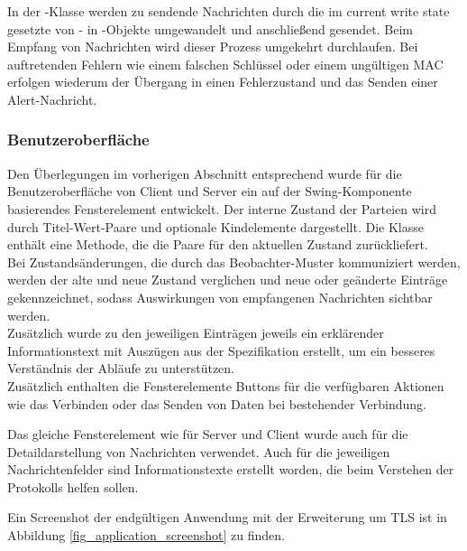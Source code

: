 In der -Klasse werden zu sendende Nachrichten durch die im current write state gesetzte \ciphersuite{} von - in -Objekte umgewandelt und anschließend gesendet. Beim Empfang von Nachrichten wird dieser Prozess umgekehrt durchlaufen. Bei auftretenden Fehlern wie einem falschen Schlüssel oder einem ungültigen MAC erfolgen wiederum der Übergang in einen Fehlerzustand und das Senden einer Alert-Nachricht.

\subsubsection{Benutzeroberfläche}

Den Überlegungen im vorherigen Abschnitt entsprechend wurde für die Benutzeroberfläche von Client und Server ein auf der Swing-Komponente  basierendes Fensterelement entwickelt. Der interne Zustand der Parteien wird durch Titel-Wert-Paare und optionale Kindelemente dargestellt. Die Klasse  enthält eine Methode, die die Paare für den aktuellen Zustand zurückliefert.\\
Bei Zustandsänderungen, die durch das Beobachter-Muster kommuniziert werden, werden der alte und neue Zustand verglichen und neue oder geänderte Einträge gekennzeichnet, sodass Auswirkungen von empfangenen Nachrichten sichtbar werden.\\
Zusätzlich wurde zu den jeweiligen Einträgen jeweils ein erklärender Informationstext mit Auszügen aus der Spezifikation erstellt, um ein besseres Verständnis der Abläufe zu unterstützen.\\
Zusätzlich enthalten die Fensterelemente Buttons für die verfügbaren Aktionen wie das Verbinden oder das Senden von Daten bei bestehender Verbindung.

Das gleiche Fensterelement wie für Server und Client wurde auch für die Detaildarstellung von Nachrichten verwendet. Auch für die jeweiligen Nachrichtenfelder sind Informationstexte erstellt worden, die beim Verstehen der Protokolls helfen sollen.

Ein Screenshot der endgültigen Anwendung mit der Erweiterung um TLS ist in Abbildung \ref{fig_application_screenshot} zu finden.

